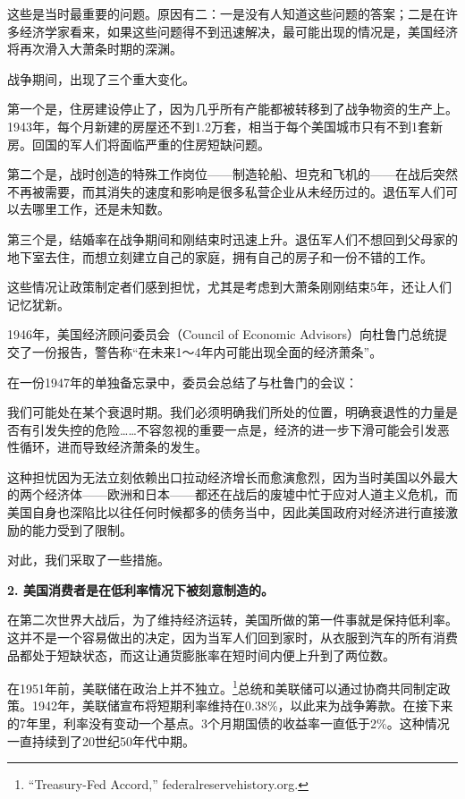 这些是当时最重要的问题。原因有二：一是没有人知道这些问题的答案；二是在许多经济学家看来，如果这些问题得不到迅速解决，最可能出现的情况是，美国经济将再次滑入大萧条时期的深渊。

战争期间，出现了三个重大变化。

第一个是，住房建设停止了，因为几乎所有产能都被转移到了战争物资的生产上。1943年，每个月新建的房屋还不到1.2万套，相当于每个美国城市只有不到1套新房。回国的军人们将面临严重的住房短缺问题。

第二个是，战时创造的特殊工作岗位——制造轮船、坦克和飞机的——在战后突然不再被需要，而其消失的速度和影响是很多私营企业从未经历过的。退伍军人们可以去哪里工作，还是未知数。

第三个是，结婚率在战争期间和刚结束时迅速上升。退伍军人们不想回到父母家的地下室去住，而想立刻建立自己的家庭，拥有自己的房子和一份不错的工作。

这些情况让政策制定者们感到担忧，尤其是考虑到大萧条刚刚结束5年，还让人们记忆犹新。

1946年，美国经济顾问委员会（Council of Economic Advisors）向杜鲁门总统提交了一份报告，警告称“在未来1～4年内可能出现全面的经济萧条”。

在一份1947年的单独备忘录中，委员会总结了与杜鲁门的会议：

{\kaishu

我们可能处在某个衰退时期。我们必须明确我们所处的位置，明确衰退性的力量是否有引发失控的危险……不容忽视的重要一点是，经济的进一步下滑可能会引发恶性循环，进而导致经济萧条的发生。

}

这种担忧因为无法立刻依赖出口拉动经济增长而愈演愈烈，因为当时美国以外最大的两个经济体——欧洲和日本——都还在战后的废墟中忙于应对人道主义危机，而美国自身也深陷比以往任何时候都多的债务当中，因此美国政府对经济进行直接激励的能力受到了限制。

对此，我们采取了一些措施。

\textbf{2. 美国消费者是在低利率情况下被刻意制造的。}

在第二次世界大战后，为了维持经济运转，美国所做的第一件事就是保持低利率。这并不是一个容易做出的决定，因为当军人们回到家时，从衣服到汽车的所有消费品都处于短缺状态，而这让通货膨胀率在短时间内便上升到了两位数。

在1951年前，美联储在政治上并不独立。\footnote{“Treasury-Fed Accord,” federalreservehistory.org.}总统和美联储可以通过协商共同制定政策。1942年，美联储宣布将短期利率维持在0.38\%，以此来为战争筹款。在接下来的7年里，利率没有变动一个基点。3个月期国债的收益率一直低于2\%。这种情况一直持续到了20世纪50年代中期。

